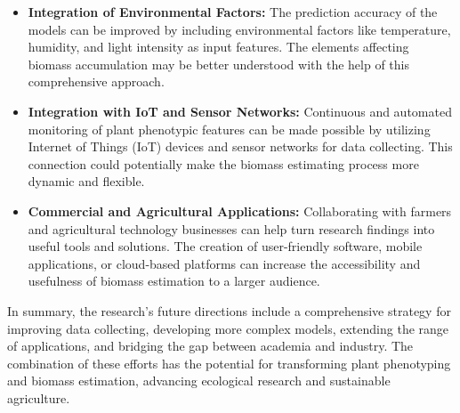\documentclass[a4paper,12pt]{report}%
\renewcommand{\\}{\vspace*{0.5\baselineskip} \newline}
\begin{document}
\begin{itemize}
    \item \textbf{Integration of Environmental Factors:} The prediction accuracy of the models can be improved by including environmental factors like temperature, humidity, and light intensity as input features. The elements affecting biomass accumulation may be better understood with the help of this comprehensive approach.

    \item \textbf{Integration with IoT and Sensor Networks:} Continuous and automated monitoring of plant phenotypic features can be made possible by utilizing Internet of Things (IoT) devices and sensor networks for data collecting. This connection could potentially make the biomass estimating process more dynamic and flexible.

    \item \textbf{Commercial and Agricultural Applications:} Collaborating with farmers and agricultural technology businesses can help turn research findings into useful tools and solutions. The creation of user-friendly software, mobile applications, or cloud-based platforms can increase the accessibility and usefulness of biomass estimation to a larger audience.
\end{itemize}

\noindent In summary, the research's future directions include a comprehensive strategy for improving data collecting, developing more complex models, extending the range of applications, and bridging the gap between academia and industry. The combination of these efforts has the potential for transforming plant phenotyping and biomass estimation, advancing ecological research and sustainable agriculture.
\end{document}
